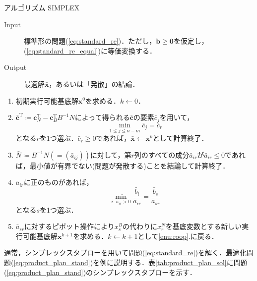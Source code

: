 \documentclass{jsreport}
\begin{document}
\begin{itembox}[l]{アルゴリズム SIMPLEX}
  \begin{description}
    \item[Input] 標準形の問題(\ref{eq:standard_re})．ただし，$\bm{b} \geq \bm{0}$を仮定し，(\ref{eq:standard_re_equal})に等価変換する．
    \item[Output] 最適解$\bar{\bm{x}}$，あるいは「発散」の結論．
  \end{description}
  \begin{enumerate}
    \item 初期実行可能基底解$\bm{x}^{0}$を求める．$k \leftarrow 0$．
    \item $\bar{\bm{c}}^{\mathrm{T}} \coloneqq \bm{c}_N^{\mathrm{T}} - \bm{c}_B^{\mathrm{T}}B^{-1}N$によって得られる$\bar{\bm{c}}$の要素$\bar{c}_j$を用いて，
    \begin{equation}
      \min_{1 \leq j \leq n - m} \bar{c}_j = \bar{c}_r \nonumber
    \end{equation}
    となる$r$を1つ選ぶ．$\bar{c}_r \geq 0$であれば，$\bar{\bm{x}} \leftarrow \bm{x}^k$として計算終了．\label{enu:roop}
    \item $\bar{N} \coloneqq B^{-1}N (=(\bar{a}_{ij}))$に対して，第$r$列のすべての成分$\bar{a}_{ir}$が$\bar{a}_{ir} \leq 0$であれば，最小値が有界でない(問題が発散する)ことを結論して計算終了．
    \item $\bar{a}_{ir}$に正のものがあれば，
    \begin{equation}
      \min_{i: \, \bar{a}_{ir} > 0} \frac{\bar{b}_i}{\bar{a}_{ir}} = \frac{\bar{b}_s}{\bar{a}_{sr}} \nonumber
    \end{equation}
    となる$s$を1つ選ぶ．
    \item $\bar{a}_{sr}$に対するピボット操作により$x_s^B$の代わりに$x_r^N$を基底変数とする新しい実行可能基底解$\bm{x}^{k + 1}$を求める．$k \leftarrow k + 1$として\ref{enu:roop}.に戻る．
  \end{enumerate}
\end{itembox}
通常，シンプレックスタブローを用いて問題(\ref{eq:standard_re})を解く．最適化問題(\ref{eq:product_plan_stand})を例に説明する．表\ref{tab:product_plan_sol}に問題(\ref{eq:product_plan_stand})のシンプレックスタブローを示す．
\end{document}
